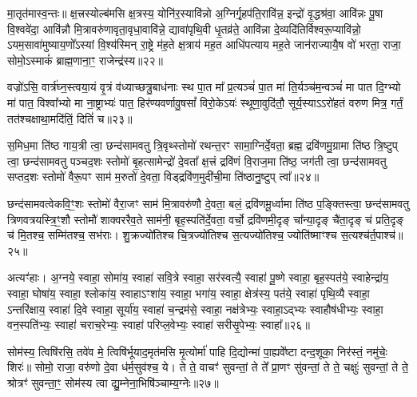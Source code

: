 मा॒तृत॑मास्व॒न्तः॥ क्ष॒त्त्रस्योल्ब॑मसि क्ष॒त्रस्य॒ योनि॑र॒स्यावि॑न्नो अ॒ग्निर्गृ॒हप॑ति॒रावि॑न्न॒ इन्द्रो॑ वृ॒द्धश्र॑वा॒ आवि॑न्नः पू॒षा वि॒श्ववे॑दा॒ आवि॑न्नौ मि॒त्रावरु॑णावृता॒वृधा॒वावि॑न्ने॒ द्यावा॑पृथि॒वी धृ॒तव्र॑ते॒ आवि॑न्ना दे॒व्यदि॑तिर्विश्वरू॒प्यावि॑न्नो॒ \-ऽयम॒सावा॑मुष्याय॒णो᳚\-ऽस्यां वि॒श्य॑स्मिन् रा॒ष्ट्रे म॑ह॒ते क्ष॒त्राय॑ मह॒त आधि॑पत्याय मह॒ते जान॑राज्यायै॒ष वो॑ भरता॒ राजा॒ सोमो॒\-ऽस्माकं॑ ब्राह्म॒णाना॒ꣳ॒ राजेन्द्र॑स्य॥२२॥

वज्रो॑\-ऽसि॒ वार्त्र॑घ्न॒स्त्वया॒यं वृ॒त्रं व॑ध्याच्छत्रु॒बाध॑नाः स्थ पा॒त मा᳚ प्र॒त्यञ्चं॑ पा॒त मा॑ ति॒र्यञ्च॑म॒न्वञ्चं॑ मा पात दि॒ग्भ्यो मा॑ पात॒ विश्वा᳚भ्यो मा ना॒ष्ट्राभ्यः॑ पात॒ हिर॑ण्यवर्णावु॒षसां᳚ विरो॒के\-ऽयः॑ स्थूणा॒वुदि॑तौ॒ सूर्य॒स्या\-ऽ\-ऽरो॑हतं वरुण मित्र॒ गर्तं॒ तत॑श्चक्षाथा॒मदि॑तिं॒ दितिं॑ च॥२३॥

{\anuvakamend[{शिशु॒रिन्द्र॒स्यैक॑चत्वारिꣳशच्च॥12॥}]}

स॒मिध॒मा ति॑ष्ठ गाय॒त्री त्वा॒ छन्द॑सामवतु त्रि॒वृथ्स्तोमो॑ रथन्त॒रꣳ सामा॒ग्निर्दे॒वता॒ ब्रह्म॒ द्रवि॑णमु॒ग्रामा ति॑ष्ठ त्रि॒ष्टुप् त्वा॒ छन्द॑सामवतु पञ्चद॒शः स्तोमो॑ बृ॒हत्सामेन्द्रो॑ दे॒वता᳚ क्ष॒त्त्रं द्रवि॑णं वि॒राज॒मा ति॑ष्ठ॒ जग॑ती त्वा॒ छन्द॑सामवतु सप्तद॒शः स्तोमो॑ वैरू॒पꣳ साम॑ म॒रुतो॑ दे॒वता॒ विड्द्रवि॑ण॒मुदी॑ची॒मा ति॑ष्ठानु॒ष्टुप् त्वा᳚॥२४॥

छन्द॑सामवत्वेकवि॒ꣳ॒शः स्तोमो॑ वैरा॒जꣳ साम॑ मि॒त्रावरु॑णौ दे॒वता॒ बलं॒ द्रवि॑णमू॒र्ध्वामा ति॑ष्ठ प॒ङ्क्तिस्त्वा॒ छन्द॑सामवतु त्रिणवत्रयस्त्रि॒ꣳ॒शौ स्तोमौ॑ शाक्वररैव॒ते साम॑नी॒ बृह॒स्पति॑र्दे॒वता॒ वर्चो॒ द्रवि॑णमी॒दृङ् चा᳚न्या॒दृङ् चै॑ता॒दृङ् च॑ प्रति॒दृङ् च॑ मि॒तश्च॒ सम्मि॑तश्च॒ सभ॑राः। शु॒क्रज्यो॑तिश्च चि॒त्रज्यो॑तिश्च स॒त्यज्यो॑तिश्च॒ ज्योति॑ष्माꣳश्च स॒त्यश्च॑र्त॒पाश्च॑॥२५॥

अत्यꣳ॑हाः। अ॒ग्नये॒ स्वाहा॒ सोमा॑य॒ स्वाहा॑ सवि॒त्रे स्वाहा॒ सर॑स्वत्यै॒ स्वाहा॑ पू॒ष्णे स्वाहा॒ बृह॒स्पत॑ये॒ स्वाहेन्द्रा॑य॒ स्वाहा॒ घोषा॑य॒ स्वाहा॒ श्लोका॑य॒ स्वाहा\-ऽꣳशा॑य॒ स्वाहा॒ भगा॑य॒ स्वाहा॒ क्षेत्र॑स्य॒ पत॑ये॒ स्वाहा॑ पृथि॒व्यै स्वाहा॒ \-ऽन्तरि॑क्षाय॒ स्वाहा॑ दि॒वे स्वाहा॒ सूर्या॑य॒ स्वाहा॑ च॒न्द्रम॑से॒ स्वाहा॒ नक्ष॑त्रेभ्यः॒ स्वाहा॒\-ऽद्भ्यः स्वाहौष॑धीभ्यः॒ स्वाहा॒ वन॒स्पति॑भ्यः॒ स्वाहा॑ चराच॒रेभ्यः॒ स्वाहा॑ परिप्ल॒वेभ्यः॒ स्वाहा॑ सरीसृ॒पेभ्यः॒ स्वाहा᳚॥२६॥

{\anuvakamend[{अ॒नु॒ष्टुप्त्व॑र्त॒पाश्च॑ सरीसृ॒पेभ्यः॒ स्वाहा᳚॥13॥}]}

सोम॑स्य॒ त्विषि॑रसि॒ तवे॑व मे॒ त्विषि॑र्भूयाद॒मृत॑मसि मृ॒त्योर्मा॑ पाहि दि॒द्योन्मा॑ पा॒ह्यवे᳚ष्टा दन्द॒शूका॒ निर॑स्तं॒ नमु॑चेः॒ शिरः॑॥ सोमो॒ राजा॒ वरु॑णो दे॒वा ध॑र्म॒सुव॑श्च॒ ये। ते ते॒ वाचꣳ॑ सुवन्तां॒ ते ते᳚ प्रा॒णꣳ सु॑वन्तां॒ ते ते॒ चक्षुः॑ सुवन्तां॒ ते ते॒ श्रोत्रꣳ॑ सुवन्ता॒ꣳ॒ सोम॑स्य त्वा द्यु॒म्नेना॒भिषि॑ञ्चाम्य॒ग्नेः॥२७॥

